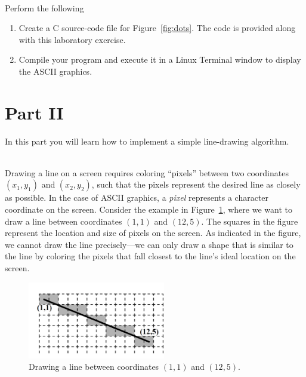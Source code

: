 \documentclass[epsfig,10pt,fullpage]{article}
\begin{document}
~\\
\noindent
Perform the following

\begin{enumerate}

\item Create a C source-code file for Figure~\ref{fig:dots}. The code is provided along 
with this laboratory exercise.

\item Compile your program and execute it in a Linux Terminal window to display the ASCII
graphics.

\end{enumerate}

\noindent
\section*{Part II}

\noindent
In this part you will learn how to implement a simple line-drawing algorithm.

~\\
\noindent
Drawing a line on a screen requires coloring ``pixels'' between two coordinates $(x_1,y_1)$ and 
$(x_2,y_2)$, such that the pixels represent the desired line as closely as possible. In
the case of ASCII graphics, a {\it pixel} represents a character coordinate on the screen.
Consider the example in Figure~\ref{fig:line_drawing}, where we want to draw a line between 
coordinates $(1,1)$ and $(12,5)$. The squares in the figure represent the location and 
size of pixels on the screen. As indicated in the figure, we cannot draw the line 
precisely---we can only draw a shape that is similar to the line by coloring the pixels that 
fall closest to the line's ideal location on the screen.

\begin{figure}[h]
   \begin{center}
			  \includegraphics[width=6cm]{figures/fig_line_drawing_vt100}
   \end{center}
   \caption{Drawing a line between coordinates $(1,1)$ and $(12,5)$.}
	\label{fig:line_drawing}
\end{figure}
\end{document}

